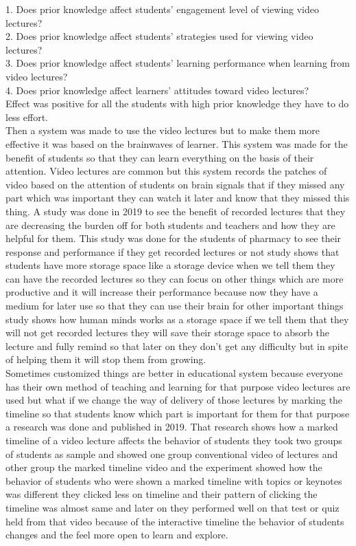 1. Does prior knowledge affect students’ engagement level of viewing video lectures?\\
2. Does prior knowledge affect students’ strategies used for viewing video lectures?\\
3. Does prior knowledge affect students’ learning performance when learning from video lectures?\\
4. Does prior knowledge affect learners’ attitudes toward video lectures?\\
Effect was positive for all the students with high prior knowledge they have to do less effort.\cite{Li2019}\\
Then a system was made to use the video lectures but to make them more effective it was based on the brainwaves of learner. This system was made for the benefit of students so that they can learn everything on the basis of their attention. Video lectures are common but this system records the patches of video based on the attention of students on brain signals that if they missed any part which was important they can watch it later and know that they missed this thing.\cite{Lin2019}
A study was done in 2019 to see the benefit of recorded lectures that they are decreasing the burden off for both students and teachers and how they are helpful for them. This study was done for the students of pharmacy to see their response and performance if they get recorded lectures or not study shows that students have more storage space like a storage device when we tell them they can have the recorded lectures so they can focus on other things which are more productive and it will increase their performance because now they have a medium for later use so that they can use their brain for other important things study shows how human minds works as a storage space if we tell them that they will not get recorded lectures they will save their storage space to absorb the lecture and fully remind so that later on they don't get any difficulty but in spite of helping them it will stop them from growing.\cite{Patel2019}\\
Sometimes customized things are better in educational system because everyone has their own method of teaching and learning for that purpose video lectures are used but what if we change the way of delivery of those lectures by marking the timeline so that students know which part is important for them for that purpose a research was done and published in 2019. That research shows how a marked timeline of a video lecture affects the behavior of students they took two groups of students as sample and showed one group conventional video of lectures and other group the marked timeline video and the experiment showed how the behavior of students who were shown a marked timeline with topics or keynotes was different they clicked less on timeline and their pattern of clicking the timeline was almost same and later on they performed well on that test or quiz held from that video because of the interactive timeline the behavior of students changes and the feel more open to learn and explore.\cite{Pimentel2019}\\

